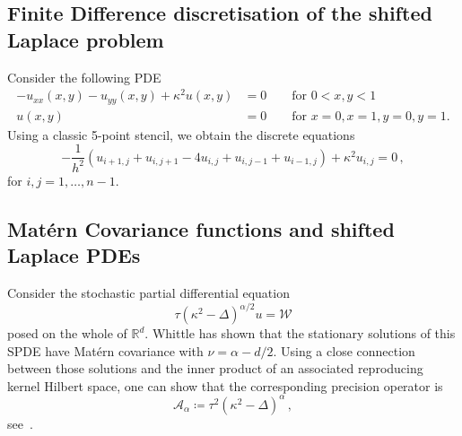\documentclass[
fontsize=11pt,
paper=a4,
numbers=noenddot
]{scrartcl}
\begin{document}
\subsection{Finite Difference discretisation of the shifted Laplace problem}
Consider the following PDE
\begin{align*}
    -u_{xx}(x,y) - u_{yy}(x,y) + \kappa^2 u(x,y) &= 0 \qquad \text{for $0 < x,y < 1$} \\
    u(x,y) &= 0 \qquad \text{for $x = 0, x = 1, y = 0, y = 1$.}
\end{align*}
Using a classic 5-point stencil, we obtain the discrete equations
\begin{equation*}
    -\frac{1}{h^2}\left(
        u_{i+1,j} + u_{i,j+1} - 4u_{i,j} + u_{i,j-1} + u_{i-1,j}
    \right)
    + \kappa^2 u_{i,j} = 0\,,
\end{equation*}
for $i,j = 1,\dotsc,n-1$.

\subsection*{Mat\'ern Covariance functions and shifted Laplace PDEs}
Consider the stochastic partial differential equation
\begin{equation*}
    \tau {(\kappa^2 - \Delta)}^{\alpha / 2} u = \mathcal{W}
\end{equation*}
posed on the whole of $\mathbb{R}^d$. Whittle has shown that the stationary solutions of this SPDE have Mat\'ern covariance with $\nu = \alpha - d/2$. Using a close connection between those solutions and the inner product of an associated reproducing kernel Hilbert space, one can show that the corresponding precision operator is
\begin{equation*}
    \mathcal{A}_\alpha \coloneqq \tau^2 {(\kappa^2 - \Delta)}^\alpha\,,
\end{equation*}
see~\cite[Sec.\ 2.2]{lindgrenSPDEApproachGaussian2022}.


\printbibliography
\end{document}

